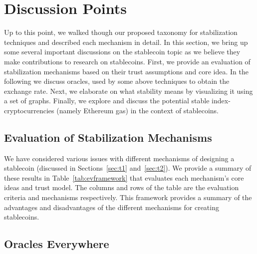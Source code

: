 
\section{Discussion Points}

Up to this point, we walked though our proposed taxonomy for stabilization techniques and described each mechanism in detail. In this section, we bring up some several important discussions on the stablecoin topic as we believe they make contributions to research on stablecoins. First, we provide an evaluation of stabilization mechanisms based on their trust assumptions and core idea. In the following we discuss oracles, used by some above techniques to obtain the exchange rate. Next, we elaborate on what stability means by visualizing it using a set of graphs. Finally, we explore and discuss the potential stable index-cryptocurrencies (namely Ethereum gas) in the context of stablecoins.


\subsection{Evaluation of Stabilization Mechanisms}

We have considered various issues with different mechanisms of designing a stablecoin (discussed in Sections~\ref{sec:t1} and~\ref{sec:t2}). We provide a summary of these results in Table~\ref{tab:evframework} that evaluates each mechanism's core ideas and trust model. The columns and rows of the table are the evaluation criteria and mechanisms respectively. This framework provides a summary of the advantages and disadvantages of the different mechanisms for creating stablecoins.





\subsection{Oracles Everywhere}

